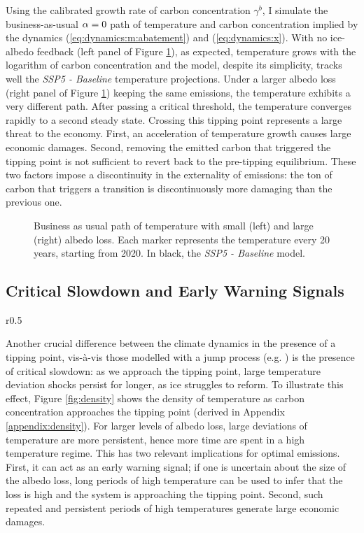 \documentclass[../../main.tex]{subfiles}
\begin{document}
Using the calibrated growth rate of carbon concentration $\gamma^{b}$, I simulate the business-as-usual $\alpha = 0$ path of temperature and carbon concentration implied by the dynamics (\ref{eq:dynamics:m:abatement}) and (\ref{eq:dynamics:x}). With no ice-albedo feedback (left panel of Figure \ref{fig:bau}), as expected, temperature grows with the logarithm of carbon concentration and the model, despite its simplicity, tracks well the \textit{SSP5 - Baseline} temperature projections. Under a larger albedo loss (right panel of Figure \ref{fig:bau}) keeping the same emissions, the temperature exhibits a very different path. After passing a critical threshold, the temperature converges rapidly to a second steady state. Crossing this tipping point represents a large threat to the economy. First, an acceleration of temperature growth causes large economic damages. Second, removing the emitted carbon that triggered the tipping point is not sufficient to revert back to the pre-tipping equilibrium. These two factors impose a discontinuity in the externality of emissions: the ton of carbon that triggers a transition is discontinuously more damaging than the previous one.

\begin{figure}[H]
    \centering
    
    \caption{Business as usual path of temperature with small (left) and large (right) albedo loss. Each marker represents the temperature every 20 years, starting from 2020. In black, the \textit{SSP5 - Baseline} model.}
    \label{fig:bau}
\end{figure}

\subsection{Critical Slowdown and Early Warning Signals}

\begin{wrapfigure}{r}{0.5\textwidth}
    \centering
    
    \caption{Density of temperature shocks at $M = 600$.}
    \label{fig:density}
\end{wrapfigure}
Another crucial difference between the climate dynamics in the presence of a tipping point, vis-à-vis those modelled with a jump process (e.g. \citealt{dietz_economic_2021,hambel_optimal_2021}) is the presence of critical slowdown: as we approach the tipping point, large temperature deviation shocks persist for longer, as ice struggles to reform. To illustrate this effect, Figure \ref{fig:density} shows the density of temperature as carbon concentration approaches the tipping point (derived in Appendix \ref{appendix:density}). For larger levels of albedo loss, large deviations of temperature are more persistent, hence more time are spent in a high temperature regime. This has two relevant implications for optimal emissions. First, it can act as an early warning signal; if one is uncertain about the size of the albedo loss, long periods of high temperature can be used to infer that the loss is high and the system is approaching the tipping point. Second, such repeated and persistent periods of high temperatures generate large economic damages.
\end{document}
